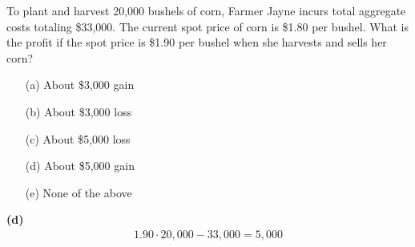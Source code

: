 \documentclass[reqno,letterpaper, onsided,10pt]{amsart}
\newcommand{\sol}[1]{\par\noindent{\bf Solution:} #1}
\begin{document}
\begin{problem}
 To plant and harvest 20,000 bushels of corn, Farmer Jayne incurs total aggregate
  costs totaling \$33,000. The current spot price of corn is \$1.80
  per bushel. What is the profit if the spot price is \$1.90 per
  bushel when she harvests and sells her corn?
\begin{itemize}
\item[(a)] About \$3,000 gain
\vskip0.1cm
\item[(b)] About \$3,000 loss
\vskip0.1cm
\item[(c)] About \$5,000 loss
\vskip0.1cm
\item[(d)] About \$5,000 gain
\vskip0.1cm
\item[(e)] None of the above
\end{itemize}
\end{problem}

\sol{{\bf (d)}\\
\begin{equation}%
    \nonumber
    \begin{split}
      1.90\cdot 20,000 - 33,000 = 5,000
    \end{split}
\end{equation}
}

\medskip
\end{document}
